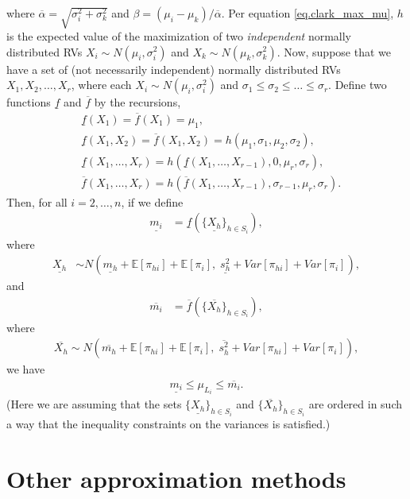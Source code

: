 \documentclass[12pt]{article}
\def\E{\mathbb{E}}
\begin{document}
where $\overline{\alpha} = \sqrt{\sigma_i^2 + \sigma_k^2}$ and $\beta = (\mu_i - \mu_k)/ \overline{\alpha}$. Per equation \eqref{eq.clark_max_mu}, $h$ is the expected value of the maximization of two {\em independent} normally distributed RVs $X_i \sim N(\mu_i, \sigma_i^2)$ and $X_k \sim N(\mu_k, \sigma_k^2)$. Now, suppose that we have a set of (not necessarily independent) normally distributed RVs $X_1, X_2, \dots, X_r$, where each $X_i \sim N(\mu_i, \sigma_i^2)$ and $\sigma_1 \leq \sigma_2 \leq \dots \leq \sigma_r$. Define two functions $\underline{f}$ and $\overline{f}$ by the recursions,
\begin{align*}
  &\underline{f}(X_1) = \overline{f}(X_1) = \mu_1, \\
  &\underline{f}(X_1, X_2) = \overline{f}(X_1, X_2) = h(\mu_1, \sigma_1, \mu_2, \sigma_2), \\
  &\underline{f}(X_1, \dots, X_r) = h(\underline{f}(X_1, \dots, X_{r - 1}), 0, \mu_r, \sigma_r), \\
  &\overline{f}(X_1, \dots, X_r) = h(\overline{f}(X_1, \dots, X_{r - 1}), \sigma_{r - 1}, \mu_r, \sigma_r).
\end{align*}
Then, for all $i = 2, \dots, n$, if we define
\begin{align*}
  \underline{m_i} &= \underline{f}(\{ \underline{X_h} \}_{h \in S_i}),
\end{align*}
where
\begin{align*}
  \underline{X_h} &\sim N(\underline{m_h} + \E[\pi_{hi}] + \E[\pi_{i}], \; \underline{s_h^2} + Var[\pi_{hi}] + Var[\pi_{i}]),
\end{align*}
and
\begin{align*}
  \overline{m_i} &= \overline{f}(\{\overline{X_h}\}_{h \in S_i}),
\end{align*}
where
\begin{align*}
  \overline{X_h} \sim N(\overline{m_h} + \E[\pi_{hi}] + \E[\pi_{i}], \; \overline{s_h^2} + Var[\pi_{hi}] + Var[\pi_{i}]),
  \end{align*}
we have 
\begin{align*}
  \underline{m_i} \leq \mu_{L_i} \leq \overline{m_i}.
\end{align*}
(Here we are assuming that the sets $\{\underline{X_h}\}_{h \in S_i}$ and $\{\overline{X_h}\}_{h \in S_i}$ are ordered in such a way that the inequality constraints on the variances is satisfied.)


\section{Other approximation methods}
\label{sect.other_methods} 
\end{document}

